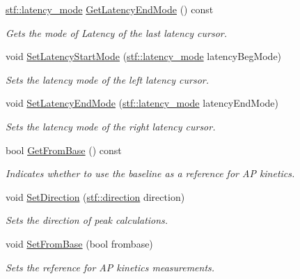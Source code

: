 \begin{DoxyCompactItemize}
\hyperlink{group__stfgen_ga738f9934a45a9d2d81cb0a3de0375c99}{stf::latency\_\-mode} \hyperlink{classwxStfCursorsDlg_a7cfc9e0616e262dfa115345b6afc16de}{GetLatencyEndMode} () const 
\begin{DoxyCompactList}\small\item\em Gets the mode of Latency of the last latency cursor. \item\end{DoxyCompactList}\item 
void \hyperlink{classwxStfCursorsDlg_a79ec551af76845fbf2b07058f3480845}{SetLatencyStartMode} (\hyperlink{group__stfgen_ga738f9934a45a9d2d81cb0a3de0375c99}{stf::latency\_\-mode} latencyBegMode)
\begin{DoxyCompactList}\small\item\em Sets the latency mode of the left latency cursor. \item\end{DoxyCompactList}\item 
void \hyperlink{classwxStfCursorsDlg_a6677d9880b2a68bcb7ffed7ad7a8871a}{SetLatencyEndMode} (\hyperlink{group__stfgen_ga738f9934a45a9d2d81cb0a3de0375c99}{stf::latency\_\-mode} latencyEndMode)
\begin{DoxyCompactList}\small\item\em Sets the latency mode of the right latency cursor. \item\end{DoxyCompactList}\item 
bool \hyperlink{classwxStfCursorsDlg_a8096e588bbd449ede67a15821d3cb34f}{GetFromBase} () const 
\begin{DoxyCompactList}\small\item\em Indicates whether to use the baseline as a reference for AP kinetics. \item\end{DoxyCompactList}\item 
void \hyperlink{classwxStfCursorsDlg_afec8b402c6f0d51d563c63e26aaf00ac}{SetDirection} (\hyperlink{group__stfgen_gae8845ae2aeaf4b742a905a2a5571fd5a}{stf::direction} direction)
\begin{DoxyCompactList}\small\item\em Sets the direction of peak calculations. \item\end{DoxyCompactList}\item 
void \hyperlink{classwxStfCursorsDlg_a9a6b329f076ae3c1e50309c5a6c79a5c}{SetFromBase} (bool frombase)
\begin{DoxyCompactList}\small\item\em Sets the reference for AP kinetics measurements. \item\end{DoxyCompactList}\item 

\end{DoxyCompactItemize}
